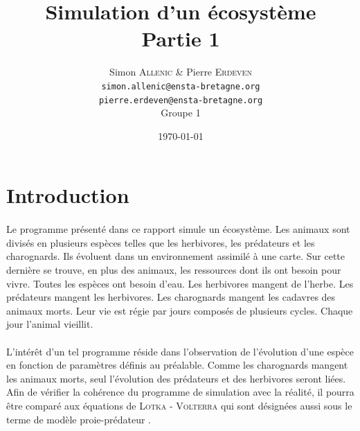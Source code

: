 \documentclass[a4paper,11pt,final,oneside]{article}
\title{Simulation d'un écosystème \\ Partie 1}
\author{Simon \textsc{Allenic} \& Pierre \textsc{Erdeven}\\
  \texttt{simon.allenic@ensta-bretagne.org} \\
  \texttt{pierre.erdeven@ensta-bretagne.org} \\ \vspace{1cm}
  Groupe 1}
\date{\today}
\begin{document}
\theoremstyle{plain}
\newtheorem{theo}{Théorème}
\newtheorem{mydef}{Définition}

\clearpage\maketitle
\thispagestyle{empty}
\newpage



\newpage

\tableofcontents
\newpage

	\section*{Introduction}

\paragraph{} Le programme présenté dans ce rapport simule un écosystème. Les animaux sont divisés en plusieurs espèces telles que les herbivores, les prédateurs et les charognards. Ils évoluent dans un environnement assimilé à une carte. Sur cette dernière se trouve, en plus des animaux, les ressources dont ils ont besoin pour vivre. Toutes les espèces ont besoin d'eau. Les herbivores mangent de l'herbe. Les prédateurs mangent les herbivores. Les charognards mangent les cadavres des animaux morts. Leur vie est régie par jours composés de plusieurs cycles. Chaque jour l'animal vieillit.

\paragraph{} L'intérêt d'un tel programme réside dans l'observation de l'évolution d'une espèce en fonction de paramètres définis au préalable. Comme les charognards mangent les animaux morts, seul l'évolution des prédateurs et des herbivores seront liées. Afin de vérifier la cohérence du programme de simulation avec la réalité, il pourra être comparé aux équations de \textsc{Lotka - Volterra} qui sont désignées aussi sous le terme de \og modèle proie-prédateur \fg.
\end{document}
